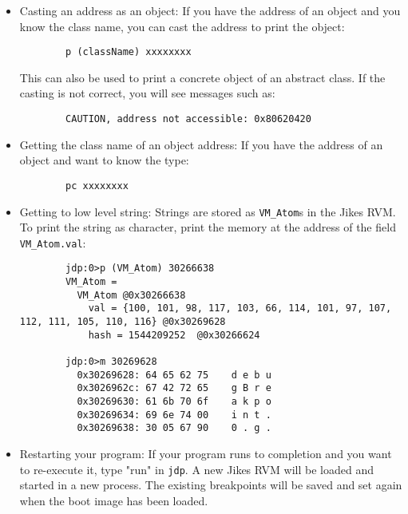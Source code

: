 \begin{itemize}
\item Casting an address as an object:
  If you have the address of an object and you know the class name,
  you can cast the address to print the object:
\begin{verbatim}
        p (className) xxxxxxxx
\end{verbatim}
  This can also be used to print a concrete object of an abstract class.
  If the casting is not correct, you will see messages such as:
\begin{verbatim}
        CAUTION, address not accessible: 0x80620420
\end{verbatim}


\item Getting the class name of an object address:
  If you have the address of an object and want to know the type:
\begin{verbatim}
        pc xxxxxxxx
\end{verbatim}


\item Getting to low level string:
  Strings are stored as {\tt VM\_Atom}s in the Jikes RVM.     
  To print the string as character, print the memory at the address of
  the field {\tt VM\_Atom.val}:

\begin{verbatim}
        jdp:0>p (VM_Atom) 30266638
        VM_Atom = 
          VM_Atom @0x30266638
            val = {100, 101, 98, 117, 103, 66, 114, 101, 97, 107, 112, 111, 105, 110, 116} @0x30269628
            hash = 1544209252  @0x30266624

        jdp:0>m 30269628
          0x30269628: 64 65 62 75    d e b u
          0x3026962c: 67 42 72 65    g B r e
          0x30269630: 61 6b 70 6f    a k p o
          0x30269634: 69 6e 74 00    i n t .
          0x30269638: 30 05 67 90    0 . g .
\end{verbatim}


\item Restarting your program:
  If your program runs to completion and you want to re-execute it,
  type "run" in {\tt jdp}.  A new Jikes RVM will be loaded and started in a new
  process.  The existing breakpoints will be saved and set again 
  when the boot image has been loaded.



\end{itemize}
